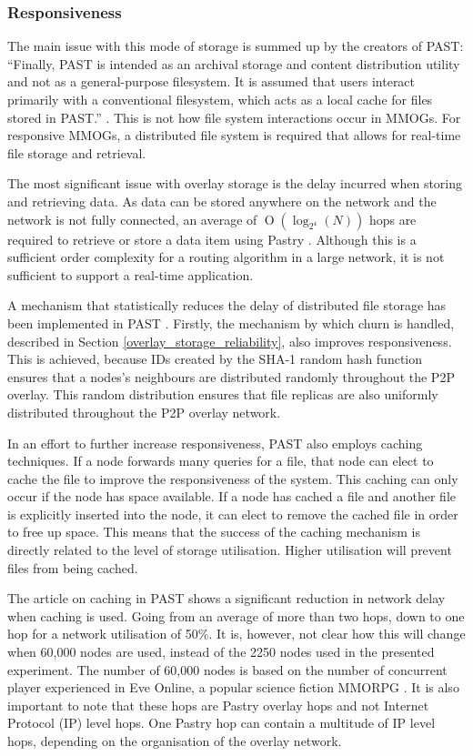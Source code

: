 \documentclass[10pt,a4paper,journal,cspaper,compsoc]{IEEEtran}
\providecommand{\OO}[1]{\operatorname{O}\left(#1\right)}
\begin{document}
\subsubsection{Responsiveness}
The main issue with this mode of storage is summed up by the creators of PAST: ``Finally, PAST is intended as an archival storage and content
distribution utility and not as a general-purpose filesystem. It is assumed that users interact primarily with a conventional filesystem, which acts
as a local cache for files stored in PAST.'' \cite{storage_and_chaching_PAST}. This is not how file system interactions occur in MMOGs. For
responsive MMOGs, a distributed file system is required that allows for real-time file storage and retrieval.

The most significant issue with overlay storage is the delay incurred when storing and retrieving data. As data can be stored anywhere on the network
and the network is not fully connected, an average of $\OO{\log_{2^4}(N)}$ hops are required to retrieve or store a data item using Pastry
\cite{storage_and_chaching_PAST}. Although this is a sufficient order complexity for a routing algorithm in a large network, it is not sufficient to
support a real-time application.

A mechanism that statistically reduces the delay of distributed file storage has been implemented in PAST \cite{storage_and_chaching_PAST}. Firstly,
the mechanism by which churn is handled, described in Section \ref{overlay_storage_reliability}, also improves responsiveness.  This is achieved,
because IDs created by the SHA-1 random hash function ensures that a nodes's neighbours are distributed randomly throughout the P2P overlay. This
random distribution ensures that file replicas are also uniformly distributed throughout the P2P overlay network.

In an effort to further increase responsiveness, PAST also employs caching techniques. If a node forwards many queries for a file, that node can
elect to cache the file to improve the responsiveness of the system. This caching can only occur if the node has space available. If a node has
cached a file and another file is explicitly inserted into the node, it can elect to remove the cached file in order to free up space. This means
that the success of the caching mechanism is directly related to the level of storage utilisation. Higher utilisation will prevent files from being
cached.

The article on caching in PAST shows a significant reduction in network delay when caching is used. Going from an average of more than two hops, down
to one hop for a network utilisation of 50\%. It is, however, not clear how this will change when 60,000 nodes are used, instead of the 2250 nodes
used in the presented experiment. The number of 60,000 nodes is based on the number of concurrent player experienced in Eve Online, a popular science
fiction MMORPG \cite{eve_pcu}. It is also important to note that these hops are Pastry overlay hops and not Internet Protocol (IP) level hops. One
Pastry hop can contain a multitude of IP level hops, depending on the organisation of the overlay network.
\end{document}
